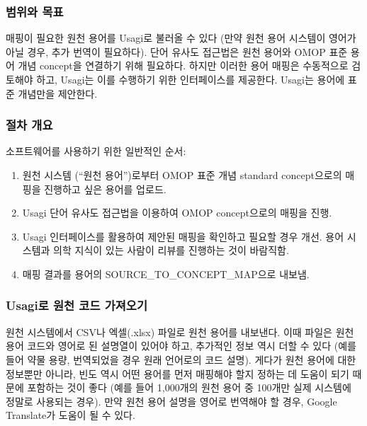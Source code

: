 \documentclass[10.5pt]{book}
\providecommand{\tightlist}{%
  \setlength{\itemsep}{0pt}\setlength{\parskip}{0pt}}
\theoremstyle{definition}
\theoremstyle{definition}
\theoremstyle{definition}
\theoremstyle{remark}
\begin{document}
\subsubsection*{범위와 목표}\label{--2}

매핑이 필요한 원천 용어를 Usagi로 불러올 수 있다 (만약 원천 용어
시스템이 영어가 아닐 경우, 추가 번역이 필요하다). 단어 유사도 접근법은
원천 용어와 OMOP 표준 용어 개념 concept을 연결하기 위해 필요하다. 하지만
이러한 용어 매핑은 수동적으로 검토해야 하고, Usagi는 이를 수행하기 위한
인터페이스를 제공한다. Usagi는 용어에 표준 개념만을 제안한다.

\subsubsection*{절차 개요}\label{--2}

소프트웨어를 사용하기 위한 일반적인 순서:

\begin{enumerate}
\def\labelenumi{\arabic{enumi}.}
\tightlist
\item
  원천 시스템 (``원천 용어'')로부터 OMOP 표준 개념 standard
  concept으로의 매핑을 진행하고 싶은 용어를 업로드.
\item
  Usagi 단어 유사도 접근법을 이용하여 OMOP concept으로의 매핑을 진행.
\item
  Usagi 인터페이스를 활용하여 제안된 매핑을 확인하고 필요할 경우 개선.
  용어 시스템과 의학 지식이 있는 사람이 리뷰를 진행하는 것이 바람직함.
\item
  매핑 결과를 용어의 SOURCE\_TO\_CONCEPT\_MAP으로 내보냄.
\end{enumerate}

\subsubsection{Usagi로 원천 코드 가져오기}\label{usagi---}

원천 시스템에서 CSV나 엑셀(.xlsx) 파일로 원천 용어를 내보낸다. 이때
파일은 원천 용어 코드와 영어로 된 설명열이 있어야 하고, 추가적인 정보
역시 더할 수 있다 (예를 들어 약물 용량, 번역되었을 경우 원래 언어로의
코드 설명). 게다가 원천 용어에 대한 정보뿐만 아니라, 빈도 역시 어떤
용어를 먼저 매핑해야 할지 정하는 데 도움이 되기 때문에 포함하는 것이
좋다 (예를 들어 1,000개의 원천 용어 중 100개만 실제 시스템에 정말로
사용되는 경우). 만약 원천 용어 설명을 영어로 번역해야 할 경우, Google
Translate가 도움이 될 수 있다.
\end{document}
